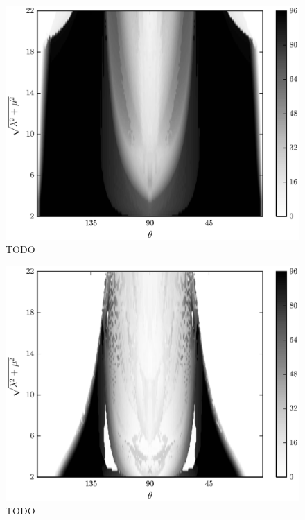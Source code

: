 	\begin{figure}
		\begin{center}
			\includegraphics{./fig/ch3/push/eb0.1/grid.eps}
		\end{center}		
		\caption{ TODO
		\label{fig:PushGrid:eb0.1}}
	\end{figure}	

	\begin{figure}
		\begin{center}
			\includegraphics{./fig/ch3/push/et0.1/grid.eps}
		\end{center}		
		\caption{ TODO
		\label{fig:PushGrid:et0.1}}
	\end{figure}
	
